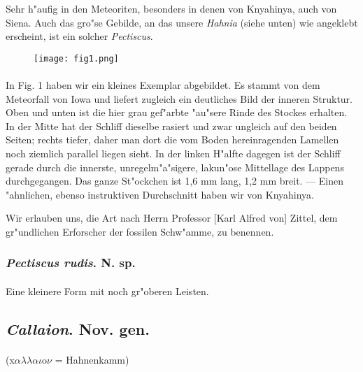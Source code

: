 \documentclass[a4paper, 11pt, oneside]{article}
\begin{document}
Sehr h"aufig in den Meteoriten, besonders in denen von Knyahinya, auch von Siena. Auch das gro"se Gebilde, an das unsere \emph{Hahnia} (siehe unten) wie angeklebt erscheint, ist ein solcher \emph{Pectiscus}.
\begin{figure}[H]
\centering
\texttt{[image: fig1.png]}
\caption{}
\end{figure}
\paragraph{}
In Fig. 1 haben wir ein kleines Exemplar abgebildet. Es stammt von dem Meteorfall von Iowa und liefert zugleich ein deutliches Bild der inneren Struktur. Oben und unten ist die hier grau gef"arbte "au"sere Rinde des Stockes erhalten. In der Mitte hat der Schliff dieselbe rasiert und zwar ungleich auf den beiden Seiten; rechts tiefer, daher man dort die vom Boden hereinragenden Lamellen noch ziemlich parallel liegen sieht. In der linken H"alfte dagegen ist der Schliff gerade durch die innerste, unregelm"a"sigere, lakun"ose Mittellage des Lappens durchgegangen. Das ganze St"ockchen ist 1,6 mm lang, 1,2 mm breit. --- Einen "ahnlichen, ebenso instruktiven Durchschnitt haben wir von Knyahinya.

Wir erlauben uns, die Art nach Herrn Professor [Karl Alfred von] Zittel, dem gr"undlichen Erforscher der fossilen Schw"amme, zu benennen.
\subsubsection{\emph{Pectiscus rudis}. N. sp.}
\paragraph{}
Eine kleinere Form mit noch gr"oberen Leisten.
\subsection{\emph{Callaion}. Nov. gen.}
\paragraph{}
(x$\alpha\lambda\lambda\alpha\iota$o$\nu$ = Hahnenkamm)%
\end{document}
